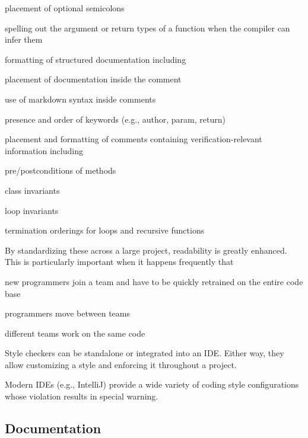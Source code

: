 \begin{compactitem}
\begin{compactitem}
     \item placement of optional semicolons
     \item spelling out the argument or return types of a function when the compiler can infer them
   \end{compactitem}  
  \item formatting of structured documentation including
   \begin{compactitem}
     \item placement of documentation inside the comment
     \item use of markdown syntax inside comments
     \item presence and order of keywords (e.g., author, param, return)
   \end{compactitem}
   \item placement and formatting of comments containing verification-relevant information including
   \begin{compactitem}
     \item pre/postconditions of methods
     \item class invariants
     \item loop invariants
     \item termination orderings for loops and recursive functions
   \end{compactitem}
\end{compactitem}
  
By standardizing these across a large project, readability is greatly enhanced.
This is particularly important when it happens frequently that
\begin{compactitem}
 \item new programmers join a team and have to be quickly retrained on the entire code base
 \item programmers move between teams
 \item different teams work on the same code
\end{compactitem}

Style checkers can be standalone or integrated into an IDE.
Either way, they allow customizing a style and enforcing it throughout a project.

Modern IDEs (e.g., IntelliJ) provide a wide variety of coding style configurations whose violation results in special warning.
  
\subsection{Documentation}

